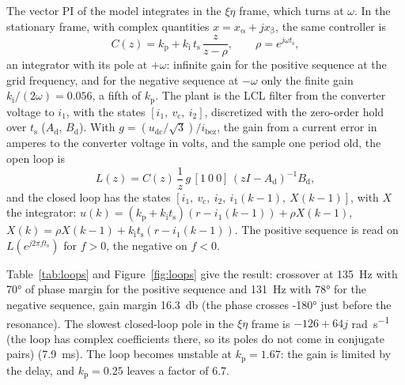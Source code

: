 \documentclass[11pt,a4paper]{scrartcl}
\newcommand{\ped}[1]{_{\mathrm{#1}}}
\begin{document}
\begin{onehalfspace}
The vector PI of the model integrates in the $\xi\eta$ frame, which turns at $\omega$. In the stationary frame, with complex quantities $x = x\ped{\alpha} + j x\ped{\beta}$, the same controller is
\begin{equation}
	C(z) = k\ped{p} + k\ped{i}\, t\ped{s}\, \frac{z}{z - \rho}, \qquad \rho = e^{j\omega t\ped{s}},
	\label{eq:cpi}
\end{equation}
an integrator with its pole at $+\omega$: infinite gain for the positive sequence at the grid frequency, and for the negative sequence at $-\omega$ only the finite gain $k\ped{i}/(2\omega) = \num{0.056}$, a fifth of $k\ped{p}$. The plant is the LCL filter from the converter voltage to $i_1$, with the states $[i_1,\ v\ped{c},\ i_2]$, discretized with the zero-order hold over $t\ped{s}$ ($A\ped{d}$, $B\ped{d}$). With $g = (u\ped{dc}/\sqrt3)/i\ped{bez}$, the gain from a current error in amperes to the converter voltage in volts, and the sample one period old, the open loop is
\begin{equation}
	L(z) = C(z)\, \frac{1}{z}\, g\, [1\ 0\ 0]\, (zI - A\ped{d})^{-1} B\ped{d},
	\label{eq:lcur}
\end{equation}
and the closed loop has the states $[i_1,\ v\ped{c},\ i_2,\ i_1(k-1),\ X(k-1)]$, with $X$ the integrator: $u(k) = (k\ped{p} + k\ped{i} t\ped{s})(r - i_1(k-1)) + \rho X(k-1)$, $X(k) = \rho X(k-1) + k\ped{i} t\ped{s}(r - i_1(k-1))$. The positive sequence is read on $L(e^{j2\pi f t\ped{s}})$ for $f > 0$, the negative on $f < 0$.

Table~\ref{tab:loops} and Figure~\ref{fig:loops} give the result: crossover at \SI{135}{\hertz} with \ang{70} of phase margin for the positive sequence and \SI{131}{\hertz} with \ang{78} for the negative sequence, gain margin \SI{16.3}{\decibel} (the phase crosses \ang{-180} just before the resonance). The slowest closed-loop pole in the $\xi\eta$ frame is $-126 + 64j$ \si{\radian\per\second} (the loop has complex coefficients there, so its poles do not come in conjugate pairs) (\SI{7.9}{\milli\second}). The loop becomes unstable at $k\ped{p} = 1.67$: the gain is limited by the delay, and $k\ped{p} = 0.25$ leaves a factor of 6.7.


\end{onehalfspace}
\end{document}
